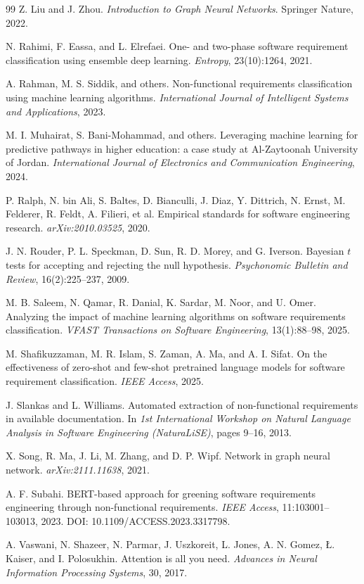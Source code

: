 \documentclass[11pt,a4paper]{article}
\begin{document}
\begin{thebibliography}{99}
 Z. Liu and J. Zhou. \emph{Introduction to Graph Neural Networks}.
Springer Nature, 2022.

 N. Rahimi, F. Eassa, and L. Elrefaei. One- and two-phase software
requirement classification using ensemble deep learning. \emph{Entropy}, 23(10):1264, 2021.

 A. Rahman, M. S. Siddik, and others. Non-functional requirements
classification using machine learning algorithms. \emph{International Journal of Intelligent
Systems and Applications}, 2023.

 M. I. Muhairat, S. Bani-Mohammad, and others. Leveraging machine
learning for predictive pathways in higher education: a case study at Al-Zaytoonah
University of Jordan. \emph{International Journal of Electronics and Communication
Engineering}, 2024.

 P. Ralph, N. bin Ali, S. Baltes, D. Bianculli, J. Diaz, Y. Dittrich,
N. Ernst, M. Felderer, R. Feldt, A. Filieri, et al. Empirical standards for software
engineering research. \emph{arXiv:2010.03525}, 2020.

 J. N. Rouder, P. L. Speckman, D. Sun, R. D. Morey, and G. Iverson.
Bayesian $t$ tests for accepting and rejecting the null hypothesis. \emph{Psychonomic
Bulletin and Review}, 16(2):225--237, 2009.

 M. B. Saleem, N. Qamar, R. Danial, K. Sardar, M. Noor, and U. Omer.
Analyzing the impact of machine learning algorithms on software requirements classification.
\emph{VFAST Transactions on Software Engineering}, 13(1):88--98, 2025.

 M. Shafikuzzaman, M. R. Islam, S. Zaman, A. Ma, and
A. I. Sifat. On the effectiveness of zero-shot and few-shot pretrained language models for
software requirement classification. \emph{IEEE Access}, 2025.

 J. Slankas and L. Williams. Automated extraction of non-functional
requirements in available documentation. In \emph{1st International Workshop on Natural
Language Analysis in Software Engineering (NaturaLiSE)}, pages 9--16, 2013.

 X. Song, R. Ma, J. Li, M. Zhang, and D. P. Wipf. Network in graph neural
network. \emph{arXiv:2111.11638}, 2021.

 A. F. Subahi. BERT-based approach for greening software requirements
engineering through non-functional requirements. \emph{IEEE Access}, 11:103001--103013,
2023.
  \newblock DOI: 10.1109/ACCESS.2023.3317798.

 A. Vaswani, N. Shazeer, N. Parmar, J. Uszkoreit, L. Jones,
A. N. Gomez, {\L}. Kaiser, and I. Polosukhin. Attention is all you need. \emph{Advances in
Neural Information Processing Systems}, 30, 2017.

\end{thebibliography}
\end{document}
